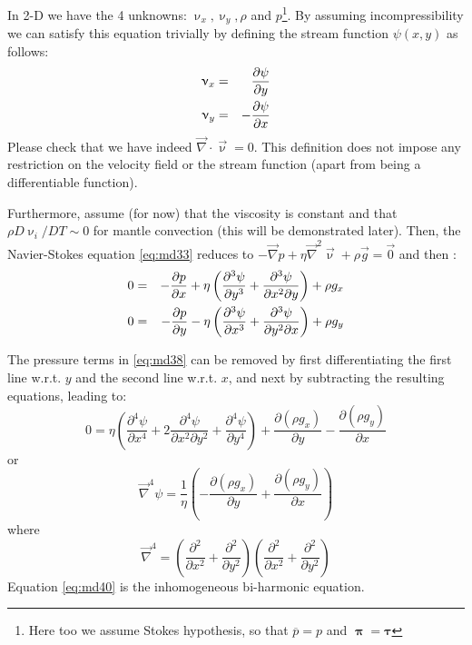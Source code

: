 In 2-D we have the 4 unknowns: $\upnu_x, \upnu_y,\rho$ and $p$\footnote{Here too we assume 
Stokes hypothesis, so that $\overline{p}=p$ and ${\bm \uppi}={\bm \tau}$}. 
By assuming incompressibility we can
satisfy this equation trivially by defining the stream function $\psi(x,y)$ as follows:
\begin{eqnarray}
\upnu_x &=& \frac{\partial \psi}{\partial y} \nonumber\\
\upnu_y &=&-\frac{\partial \psi}{\partial x} \label{eq:md37}
\end{eqnarray}
Please check that we have indeed $\vec\nabla\cdot\vec\upnu=0$.
This definition does not impose any restriction on the velocity
field or the stream function (apart from being a differentiable function).

Furthermore, assume (for now) that the viscosity is constant and that
$\rho D\upnu_i/DT \sim 0$ for mantle
convection (this will be demonstrated later). Then, the Navier-Stokes equation \eqref{eq:md33}
reduces to $-\vec\nabla p + \eta \vec\nabla^2 \vec\upnu + \rho \vec{g} =\vec{0}$ and then :
\begin{eqnarray}
0 &=& -\frac{\partial p}{\partial x} + \eta \left( 
\frac{\partial^3 \psi}{\partial y^3}  + \frac{\partial^3 \psi}{\partial x^2 \partial y}  
\right) + \rho g_x \nonumber\\
0 &=& -\frac{\partial p}{\partial y} - \eta \left( 
\frac{\partial^3 \psi}{\partial x^3}  + \frac{\partial^3 \psi}{\partial y^2 \partial x}  
\right) + \rho g_y 
\label{eq:md38}
\end{eqnarray}


\vspace{0.5cm}
\vspace{0.5cm}

The pressure terms in \eqref{eq:md38} can be removed by first differentiating 
the first line w.r.t. $y$ and the second line w.r.t. $x$, 
and next by subtracting the resulting equations, leading to:
\begin{equation}
0 = \eta 
\left(
\frac{\partial^4 \psi}{\partial x^4}
+
2\frac{\partial^4 \psi}{\partial x^2\partial y^2}
+
\frac{\partial^4 \psi}{\partial y^4}
\right)
+\frac{\partial (\rho g_x)}{\partial y}
-\frac{\partial (\rho g_y)}{\partial x}
\label{eq:md39}
\end{equation}
or
\begin{equation}
\vec\nabla^4 \psi = \frac{1}{\eta} \left( -\frac{\partial (\rho g_x)}{\partial y}
+\frac{\partial (\rho g_y)}{\partial x} \right)
\label{eq:md40}
\end{equation}
where
\[
\vec\nabla^4 = 
\left( 
\frac{\partial^2 }{\partial x^2} + \frac{\partial^2 }{\partial y^2} 
\right) 
\left( 
\frac{\partial^2 }{\partial x^2} + \frac{\partial^2 }{\partial y^2} 
\right) 
\]
Equation \eqref{eq:md40} is the inhomogeneous bi-harmonic equation.



